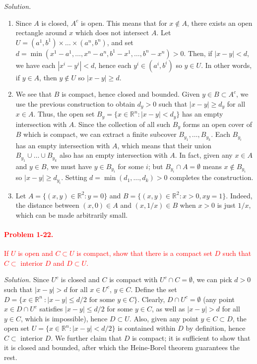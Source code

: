 \documentclass[11pt]{report}
\newcommand{\R}{\mathbb{R}}
\newcommand{\problem}[1]{\paragraph{Problem #1.}}
\newcommand{\solution}{\noindent\textit{Solution.} }
\begin{document}
    \solution \begin{enumerate}
        \item Since $A$ is closed, $A^c$ is open. This means that for $x \notin A$,
        there exists an open rectangle around $x$ which does not intersect $A$. Let
        $U = (a^1, b^1) \times \dots \times (a^n, b^n)$, and set $d = \min(x^1 - a^1,
        \dots, x^n - a^n, b^1 - x^1, \dots, b^n - x^n)  > 0$. Then, if $|x - y| <
        d$, we have each $|x^i - y^i| < d$, hence each $y^i \in (a^i, b^i)$ so $y
        \in U$. In other words, if $y \in A$, then $y \notin U$ so $|x - y| \geq d$.

        \item We see that $B$ is compact, hence closed and bounded. Given $y \in B
        \subset A^c$, we use the previous construction to obtain $d_y > 0$ such that
        $|x - y| \geq d_y$ for all $x \in A$. Thus, the open set $B_y = \{x \in \R^n
        : |x - y| < d_y\}$ has an empty intersection with $A$. Since the collection
        of all such $B_y$ forms an open cover of $B$ which is compact, we can extract
        a finite subcover $B_{y_1}, \dots, B_{y_k}$. Each $B_{y_i}$ has an empty
        intersection with $A$, which means that their union $B_{y_1} \cup \dots \cup
        B_{y_k}$ also has an empty intersection with $A$. In fact, given any $x \in
        A$ and $y \in B$, we must have $y \in B_{y_i}$ for some $i$; but $B_{y_i}
        \cap A = \emptyset$ means $x \notin B_{y_i}$ so $|x - y| \geq d_{y_i}$.
        Setting $d = \min(d_1, \dots, d_k) > 0$ completes the construction.

        \item Let $A = \{(x, y) \in \R^2 : y = 0 \}$ and $B = \{(x, y) \in \R^2 :
        x > 0, xy = 1\}$. Indeed, the distance between $(x, 0) \in A$ and $(x, 1 /
        x) \in B$ when $x > 0$ is just $1 / x$, which can be made arbitrarily small.
    \end{enumerate}


    \textcolor{red}{
    \problem{1-22} If $U$ is open and $C \subset U$ is compact, show that there is a
    compact set $D$ such that $C \subset$ interior $D$ and $D \subset U$. \\
    }

    \solution Since $U^c$ is closed and $C$ is compact with $U^c \cap C = \emptyset$,
    we can pick $d > 0$ such that $|x - y| > d$ for all $x \in U^c$, $y \in C$.
    Define the set $D = \{x \in \R^n\ : |x - y| \leq d / 2 \text{ for some } y \in
    C\}$. Clearly, $D \cap U^c = \emptyset$ (any point $x \in D \cap U^c$ satisfies
    $|x - y| \leq d / 2$ for some $y \in C$, as well as $|x - y| > d$ for all $y \in
    C$, which is impossible), hence $D \subset U$. Also, given any point $y \in C
    \subset D$, the open set $U = \{x \in \R^n: |x - y| < d / 2\}$ is contained
    within $D$ by definition, hence $C \subset$ interior $D$.  We further claim that
    $D$ is compact; it is sufficient to show that it is closed and bounded, after
    which the Heine-Borel theorem guarantees the rest.
\end{document}
